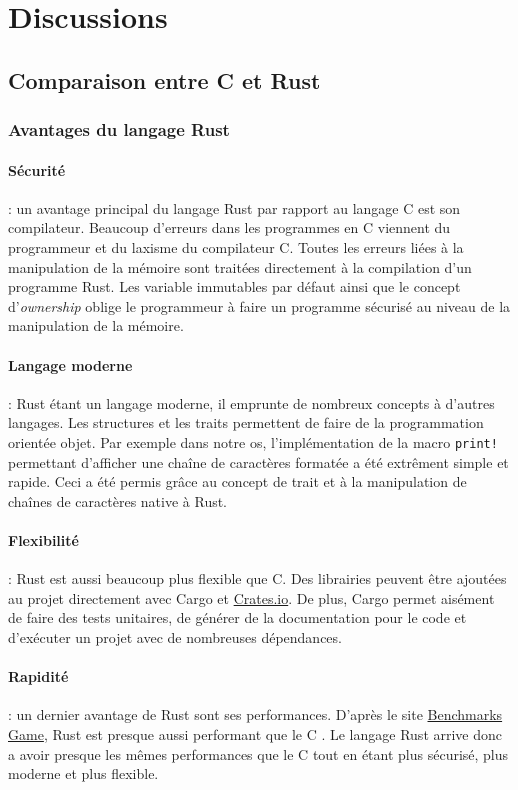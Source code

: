 \documentclass[a4paper, 12pt]{article}
\begin{document}
\section{Discussions}
\subsection{Comparaison entre C et Rust}
\subsubsection{Avantages du langage Rust}
\paragraph{Sécurité} :
un avantage principal du langage Rust par rapport au langage C est son compilateur.
Beaucoup d'erreurs dans les programmes en C viennent du programmeur et du laxisme
du compilateur C. Toutes les erreurs liées à la manipulation de la mémoire sont
traitées directement à la compilation d'un programme Rust. Les variable immutables
par défaut ainsi que le concept d'\textit{ownership} oblige le programmeur à faire
un programme sécurisé au niveau de la manipulation de la mémoire.

\paragraph{Langage moderne} :
Rust étant un langage moderne, il emprunte de nombreux concepts à d'autres langages.
Les structures et les traits permettent de faire de la programmation orientée objet.
Par exemple dans notre \acrshort{os}, l'implémentation de la macro \texttt{print!}
permettant d'afficher une chaîne de caractères formatée a été extrêment simple et
rapide. Ceci a été permis grâce au concept de trait et à la manipulation de chaînes
de caractères native à Rust.

\paragraph{Flexibilité} :
Rust est aussi beaucoup plus flexible que C. Des librairies peuvent être ajoutées
au projet directement avec Cargo et \href{https://crates.io}{Crates.io}. De plus,
Cargo permet aisément de faire des tests unitaires, de générer de la documentation
pour le code et d'exécuter un projet avec de nombreuses dépendances.

\paragraph{Rapidité} :
un dernier avantage de Rust sont ses performances. D'après le site
\href{https://benchmarksgame-team.pages.debian.net/benchmarksgame/}{Benchmarks Game},
Rust est presque aussi performant que le C \cite{ref30}. Le langage Rust arrive
donc a avoir presque les mêmes performances que le C tout en étant plus sécurisé,
plus moderne et plus flexible.
\end{document}
